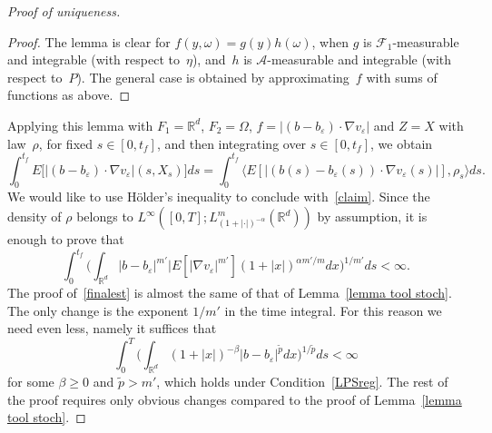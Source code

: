 \documentclass[a4paper,10pt]{article}
\newcommand\1{\mathbbm{1}}
\newcommand{\mc}{\mathcal}
\newcommand{\lan}{\langle}
\newcommand{\ran}{\rangle}
\newcommand{\td}{\tilde}
\newcommand{\eps}{\varepsilon}
\numberwithin{equation}{section}
\begin{document}
\begin{proof}[Proof of uniqueness]
\begin{proof}
The lemma is clear for $f(y,\omega)=g(y)h(\omega)$, when $g$ is $\mc{F}_1$-measurable and integrable (with respect to~$\eta$), and~$h$ is $\mc{A}$-measurable and integrable (with respect to~$P$). The general case is obtained by approximating~$f$ with sums of functions as above.
\end{proof}

Applying this lemma with $F_1 = \mathbb{R}^d$, $F_2 = \Omega$, $f=|(b-b_\eps) \cdot \nabla v_\eps|$ and $Z=X$ with law~$\rho$, for fixed $s \in [0,t_f]$, and then integrating over $s \in [0,t_f]$, we obtain 
\begin{equation*}
 \int^{t_f}_0 E \big[ |(b-b_\eps)\cdot\nabla v_\eps|(s,X_s) \big] ds
 = \int^{t_f}_0 \lan E[|(b(s)-b_\eps(s))\cdot \nabla v_\eps(s)|],\rho_s\ran ds .
\end{equation*}
We would like to use H\"older's inequality to conclude with~\eqref{claim}. Since the density of $\rho$ belongs to $L^\infty([0,T];L^m_{(1+|\cdot|)^{-\alpha}}(\mathbb{R}^d))$ by assumption, it is enough to prove that
\begin{equation}
\int^{t_f}_0\Big(\int_{\mathbb{R}^d}|b-b_\eps|^{m'}|E[|\nabla v_\eps|^{m'}](1+|x|)^{\alpha m'/m} dx\Big)^{1/m'}ds < \infty .\label{finalest}
\end{equation}
The proof of~\eqref{finalest} is almost the same of that of Lemma~\ref{lemma tool stoch}. The only change is the exponent $1/m'$ in the time integral. For this reason we need even less, namely it suffices that
\begin{equation*}
\int^T_0 \Big(\int_{\mathbb{R}^d}(1+|x|)^{-\beta}|b-b_\eps|^{\td{p}}dx\Big)^{1/\td{p}}ds< \infty
\end{equation*}
for some $\beta\ge0$ and $\td{p}>m'$, which holds under Condition~\ref{LPSreg}. The rest of the proof requires only obvious changes compared to the proof of Lemma~\ref{lemma tool stoch}. 
\end{proof}
\end{document}

